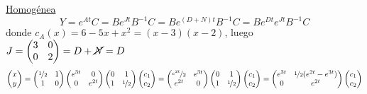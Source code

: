 \begin{ejer}
\begin{sol}
        \underline{Homogénea}
        $$Y=e^{At}C=B e^{Jt} B^{-1} C=B e^{(D+N)t} B^{-1} C=B e^{Dt} e^{Jt} B^{-1} C$$
        donde $c_A(x)=6-5x+x^2=(x-3)(x-2)$, luego $J=\begin{pmatrix}
            3 & 0 \\
            0 & 2
        \end{pmatrix}=D+\cancel{N}=D$ $$\begin{pmatrix}
            x \\ y
        \end{pmatrix}=\begin{pmatrix}
            \nicefrac{1}{2} & 1 \\
            1 & 0
        \end{pmatrix}\begin{pmatrix}
            e^{3t} & 0 \\
            0 & e^{2t}
        \end{pmatrix}\begin{pmatrix}
            0 & 1 \\
            1 & \nicefrac{1}{2} 
        \end{pmatrix}\begin{pmatrix}
            c_1 \\ c_2
        \end{pmatrix} =\begin{pmatrix}
            \nicefrac{e^{2t}}{2} & e^{3t} \\ e^{2t} & 0
        \end{pmatrix}\begin{pmatrix}
            0 & 1 \\
            1 & \nicefrac{1}{2} 
        \end{pmatrix}\begin{pmatrix}
            c_1 \\ c_2
        \end{pmatrix}= \begin{pmatrix}
            e^{3t} & \nicefrac{1}{2}(e^{2t}-e^{3t}) \\ 0 & e^{2t} 
        \end{pmatrix}\begin{pmatrix}
            c_1 \\ c_2
        \end{pmatrix}$$
    \end{sol}


\end{ejer}
